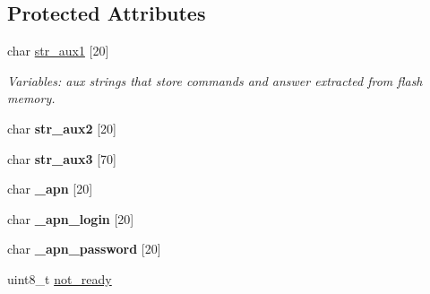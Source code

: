 \subsection*{Protected Attributes}
\begin{DoxyCompactItemize}
\item 
char \hyperlink{class_wasp_g_p_r_s___pro__core_ac36ea9c8f8b6ee0f64fe3224c74ac030}{str\+\_\+aux1} \mbox{[}20\mbox{]}\hypertarget{class_wasp_g_p_r_s___pro__core_ac36ea9c8f8b6ee0f64fe3224c74ac030}{}\label{class_wasp_g_p_r_s___pro__core_ac36ea9c8f8b6ee0f64fe3224c74ac030}

\begin{DoxyCompactList}\small\item\em Variables\+: aux strings that store commands and answer extracted from flash memory. \end{DoxyCompactList}\item 
char {\bfseries str\+\_\+aux2} \mbox{[}20\mbox{]}\hypertarget{class_wasp_g_p_r_s___pro__core_abcdcd62f3d94f97a110f07acc4ba4954}{}\label{class_wasp_g_p_r_s___pro__core_abcdcd62f3d94f97a110f07acc4ba4954}

\item 
char {\bfseries str\+\_\+aux3} \mbox{[}70\mbox{]}\hypertarget{class_wasp_g_p_r_s___pro__core_a6baf48d4ae4effe44d30579429018b40}{}\label{class_wasp_g_p_r_s___pro__core_a6baf48d4ae4effe44d30579429018b40}

\item 
char {\bfseries \+\_\+apn} \mbox{[}20\mbox{]}\hypertarget{class_wasp_g_p_r_s___pro__core_acf9c45c3752a3f066e7a50e2f81b8e2b}{}\label{class_wasp_g_p_r_s___pro__core_acf9c45c3752a3f066e7a50e2f81b8e2b}

\item 
char {\bfseries \+\_\+apn\+\_\+login} \mbox{[}20\mbox{]}\hypertarget{class_wasp_g_p_r_s___pro__core_a60f548092989d8989678545be318798b}{}\label{class_wasp_g_p_r_s___pro__core_a60f548092989d8989678545be318798b}

\item 
char {\bfseries \+\_\+apn\+\_\+password} \mbox{[}20\mbox{]}\hypertarget{class_wasp_g_p_r_s___pro__core_a3c438fcbafc656ae946352bf8ae00291}{}\label{class_wasp_g_p_r_s___pro__core_a3c438fcbafc656ae946352bf8ae00291}

\item 
uint8\+\_\+t \hyperlink{class_wasp_g_p_r_s___pro__core_af89af5d758cde6cf4e0530d62979ae00}{not\+\_\+ready}\hypertarget{class_wasp_g_p_r_s___pro__core_af89af5d758cde6cf4e0530d62979ae00}{}\label{class_wasp_g_p_r_s___pro__core_af89af5d758cde6cf4e0530d62979ae00}


\end{DoxyCompactItemize}
